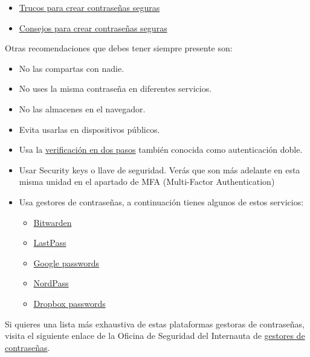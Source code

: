 \documentclass[
  spanish,
  a4paper,
  openany]{book}
\providecommand{\tightlist}{%
  \setlength{\itemsep}{0pt}\setlength{\parskip}{0pt}}
\begin{document}
\begin{itemize}
\item
  \href{https://www.pandasecurity.com/es/mediacenter/seguridad/10-trucos-para-crear-contrasenas-seguras/}{Trucos para crear contraseñas seguras}
\item
  \href{https://www.genbeta.com/seguridad/especial-contrasenas-seguras-consejos-para-mejorar-la-seguridad-de-tus-contrasenas}{Consejos para crear contraseñas seguras}
\end{itemize}

Otras recomendaciones que debes tener siempre presente son:

\begin{itemize}
\item
  No las compartas con nadie.
\item
  No uses la misma contraseña en diferentes servicios.
\item
  No las almacenes en el navegador.
\item
  Evita usarlas en dispositivos públicos.
\item
  Usa la \href{https://www.osi.es/es/actualidad/blog/2019/02/27/el-factor-de-autenticacion-doble-y-multiple}{verificación en dos pasos} también conocida como autenticación doble.
\item
  Usar Security keys o llave de seguridad. Verás que son más adelante en esta misma unidad en el apartado de MFA (Multi-Factor Authentication)
\item
  Usa gestores de contraseñas, a continuación tienes algunos de estos servicios:

  \begin{itemize}
  \tightlist
  \item
    \href{https://bitwarden.com/}{Bitwarden}
  \item
    \href{https://www.lastpass.com/es/}{LastPass}
  \item
    \href{https://passwords.google.com/}{Google passwords}
  \item
    \href{https://nordpass.com/homepage/}{NordPass}
  \item
    \href{https://www.dropbox.com/es_ES/features/security/passwords}{Dropbox passwords}
  \end{itemize}
\end{itemize}

Si quieres una lista más exhaustiva de estas plataformas gestoras de contraseñas, visita el siguiente enlace de la Oficina de Seguridad del Internauta de \href{https://www.osi.es/es/herramientas-gratuitas/categoria/privacidad-y-seguridad-de-datos/cifrado-de-datos-y-gestion-de-contrasenas}{gestores de contraseñas}.
\end{document}
